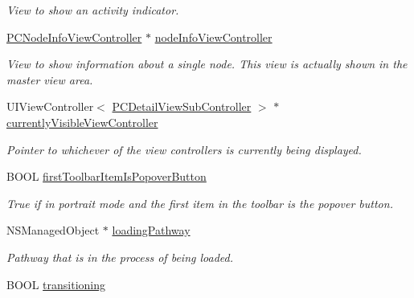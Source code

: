 \begin{Indent}
\begin{DoxyCompactItemize}
\begin{DoxyCompactList}\small\item\em View to show an activity indicator. \end{DoxyCompactList}\item 
\hypertarget{interface_p_c_detail_view_controller_ac7de0fe4e8cf25429ad5d314017ccae1}{
\hyperlink{interface_p_c_node_info_view_controller}{PCNodeInfoViewController} $\ast$ \hyperlink{interface_p_c_detail_view_controller_ac7de0fe4e8cf25429ad5d314017ccae1}{nodeInfoViewController}}
\label{interface_p_c_detail_view_controller_ac7de0fe4e8cf25429ad5d314017ccae1}

\begin{DoxyCompactList}\small\item\em View to show information about a single node. This view is actually shown in the master view area. \end{DoxyCompactList}\item 
\hypertarget{interface_p_c_detail_view_controller_a12a2d8234e55179122c04cc06f01c19a}{
UIViewController$<$ \hyperlink{protocol_p_c_detail_view_sub_controller-p}{PCDetailViewSubController} $>$ $\ast$ \hyperlink{interface_p_c_detail_view_controller_a12a2d8234e55179122c04cc06f01c19a}{currentlyVisibleViewController}}
\label{interface_p_c_detail_view_controller_a12a2d8234e55179122c04cc06f01c19a}

\begin{DoxyCompactList}\small\item\em Pointer to whichever of the view controllers is currently being displayed. \end{DoxyCompactList}\item 
BOOL \hyperlink{interface_p_c_detail_view_controller_ae889b05b8bc880ad0b5f4bb393bececc}{firstToolbarItemIsPopoverButton}
\begin{DoxyCompactList}\small\item\em True if in portrait mode and the first item in the toolbar is the popover button. \end{DoxyCompactList}\item 
\hypertarget{interface_p_c_detail_view_controller_a60fd13b3f9020ec86a54d56ee555c5e9}{
NSManagedObject $\ast$ \hyperlink{interface_p_c_detail_view_controller_a60fd13b3f9020ec86a54d56ee555c5e9}{loadingPathway}}
\label{interface_p_c_detail_view_controller_a60fd13b3f9020ec86a54d56ee555c5e9}

\begin{DoxyCompactList}\small\item\em Pathway that is in the process of being loaded. \end{DoxyCompactList}\item 
\hypertarget{interface_p_c_detail_view_controller_a4e64f01485c2fb2f9668a39fb3aefa85}{
BOOL \hyperlink{interface_p_c_detail_view_controller_a4e64f01485c2fb2f9668a39fb3aefa85}{transitioning}}
\label{interface_p_c_detail_view_controller_a4e64f01485c2fb2f9668a39fb3aefa85}


\end{DoxyCompactItemize}
\end{Indent}
